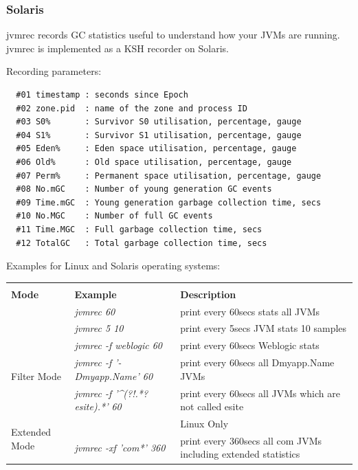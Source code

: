 \subsubsection{Solaris}
jvmrec records GC statistics useful to understand how your JVMs are
running. jvmrec is implemented as a KSH recorder on Solaris.

\noindent
Recording parameters:

\begin{verbatim}
  #01 timestamp : seconds since Epoch
  #02 zone.pid  : name of the zone and process ID
  #03 S0%       : Survivor S0 utilisation, percentage, gauge
  #04 S1%       : Survivor S1 utilisation, percentage, gauge
  #05 Eden%     : Eden space utilisation, percentage, gauge
  #06 Old%      : Old space utilisation, percentage, gauge
  #07 Perm%     : Permanent space utilisation, percentage, gauge
  #08 No.mGC    : Number of young generation GC events
  #09 Time.mGC  : Young generation garbage collection time, secs
  #10 No.MGC    : Number of full GC events
  #11 Time.MGC  : Full garbage collection time, secs
  #12 TotalGC   : Total garbage collection time, secs
\end{verbatim}

\noindent
\newline
Examples for Linux and Solaris operating systems:
\begin{center}
\begin{tabular}{lll}

\multicolumn{3}{c}{} \\
\textbf{Mode} & \textbf{Example} & \textbf{Description} \\ \hline
\newline

\multirow{2}{*}{\small{Default Mode}} & \small{\emph{jvmrec 60}} &
 \small{print every 60secs stats all JVMs}\\

 & \small{\emph{jvmrec 5 10}} & \small{print every 5secs JVM stats 10
samples}\\
 \hline

\multirow{3}{*}{\small{Filter Mode}} &
 \small{\emph{jvmrec -f weblogic 60}} &
 \small{print every 60secs Weblogic stats}\\

 & \small{\emph{jvmrec -f '-Dmyapp.Name' 60}} &
   \small{print every 60secs all Dmyapp.Name JVMs}\\

 & \small{\emph{jvmrec -f '\^{}(?!.*?esite).*' 60}} &
   \small{print every 60secs all JVMs which are not called esite}\\

\hline
\multirow{2}{*}{\small{Extended Mode}} &
 \small{} & \small{Linux Only} \\ &
 \small{\emph{jvmrec -xf 'com*' 360}} &
 \small{print every 360secs all com JVMs including extended statistics}\\

\end{tabular}
\end{center}




